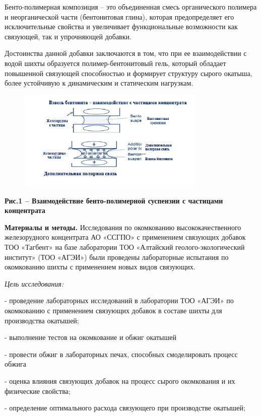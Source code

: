 Бенто-полимерная композиция -- это объединенная смесь органического
полимера и неорганической части (бентонитовая глина), которая
предопределяет его исключительные свойства и увеличивает функциональные
возможности как связующей, так и упрочняющей добавки.

Достоинства данной добавки заключаются в том, что при ее взаимодействии
с водой шихты образуется полимер-бентонитовый гель, который обладает
повышенной связующей способностью и формирует структуру сырого окатыша,
более устойчивую к динамическим и статическим нагрузкам.


\begin{figure}[H]
	\centering
	\includegraphics[width=0.8\textwidth]{media/chem2/image61}
	\caption*{}
\end{figure}


{\bfseries Рис.1 -- Взаимодействие бенто-полимерной суспензии с частицами
концентрата}

{\bfseries Материалы и методы.} Исследования по окомкованию
высококачественного железорудного концентрата АО «ССГПО» с применением
связующих добавок ТОО «Тагбент» на базе лаборатории ТОО «Алтайский
геолого-экологический институт» (ТОО «АГЭИ») были проведены лабораторные
испытания по окомкованию шихты с применением новых видов связующих.

\emph{Цель исследования:}


- проведение лабораторных исследований в лаборатории ТОО «АГЭИ» по
окомкованию с применением связующих добавок в составе шихты для
производства окатышей;

- выполнение тестов на окомкование и обжиг окатышей

- провести обжиг в лабораторных печах, способных смоделировать процесс
обжига

- оценка влияния связующих добавок на процесс сырого окомкования и их
физические свойства;

- определение оптимального расхода связующего при производстве окатышей;


